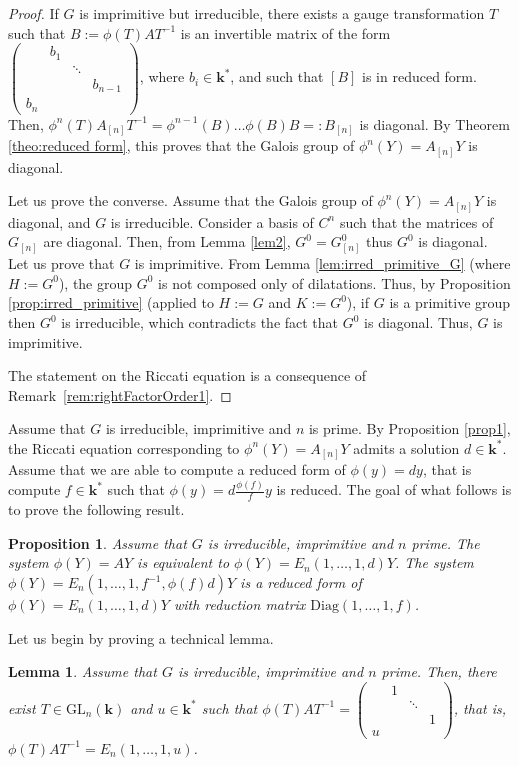 \documentclass[a4paper,11pt]{amsart}
\newtheorem{prop}[thm]{Proposition}
\newtheorem{lem}[thm]{Lemma}
\def\k{\mathbf{k}}
\begin{document}
 \begin{proof}
 If $G$ is imprimitive but irreducible,  there exists a gauge transformation $T$ such that $B:=\phi(T)AT^{-1}$ is an invertible matrix of the form  $\begin{pmatrix}
& b_1&&\\ 
 &  &\ddots & \\
&&&b_{n-1}\\
b_{n}&&&
\end{pmatrix}$, where $b_i\in \mathbf{k}^*$,  and  such that $[B]$ is in reduced form.  Then,  $\phi^{n}(T)A_{[n]}T^{-1}=\phi^{n-1}(B)\dots \phi(B)B=:B_{[n]}$ is diagonal.   By Theorem \ref{theo:reduced form}, 
this proves that the Galois group of $\phi^{n}(Y)=A_{[n]}Y$ is  diagonal. \par 
    Let us prove the converse.   Assume that the Galois group of $\phi^{n}(Y)=A_{[n]}Y$ is  diagonal,  and $G$ is irreducible.  Consider  a basis of $C^n$ such that the matrices of  $G_{[n]}$ are diagonal. Then, from Lemma \ref{lem2},   $G^0 =G_{[n]}^0$ thus $G^0$ is  diagonal.  Let us prove that $G$ is imprimitive. 
From Lemma \ref{lem:irred_primitive_G} (where $H:=G^0$), the group $G^0$ is not composed only of dilatations. Thus, by Proposition \ref{prop:irred_primitive} (applied to $H:=G$ and $K:=G^0$), if $G$ is a primitive group then $G^0$ is irreducible, which contradicts the fact that $G^0$ is diagonal. Thus, $G$ is imprimitive. 
 
The statement on the Riccati equation is a consequence of Remark~\ref{rem:rightFactorOrder1}.
\end{proof}


Assume that $G$ is irreducible,  imprimitive and $n$ is prime.  By Proposition  \ref{prop1}, the Riccati equation corresponding to $\phi^n (Y)=A_{[n]}Y$ admits a solution    $d\in \k^*$.   Assume that we are able to compute a reduced form of $\phi(y)=dy$, that is compute $f\in \k^*$ such that $\phi(y)=d\frac{\phi(f)}{f}y$ is reduced. The goal of what follows is to prove the following result.

\begin{prop}\label{prop2}
 Assume that $G$ is irreducible, imprimitive  and $n$ prime. The system $\phi(Y)=AY$ is equivalent to $\phi(Y)=E_n (1,\dots, 1, d)Y$. 
The system $\phi(Y)=E_n (1,\dots, 1,f^{-1}, \phi(f)d)Y$ is a reduced form of $\phi(Y)=E_n (1,\dots, 1, d)Y$ with reduction matrix $\mathrm{Diag}(1,\ldots,1,f)$.
\end{prop}

Let us begin by proving a technical lemma. 
\begin{lem}\label{lem5}
 Assume that $G$ is irreducible, imprimitive  and $n$ prime.  Then, there exist $T\in \mathrm{GL}_n (\mathbf{k})$ and $u\in \mathbf{k}^*$ such that $\phi(T)AT^{-1}=\begin{pmatrix}
& 1&&\\ 
 &  &\ddots & \\
&&&1\\
u&&&
\end{pmatrix}$, that is, $\phi(T)AT^{-1}=E_n(1,\ldots,1,u)$. 
\end{lem}
\end{document}
